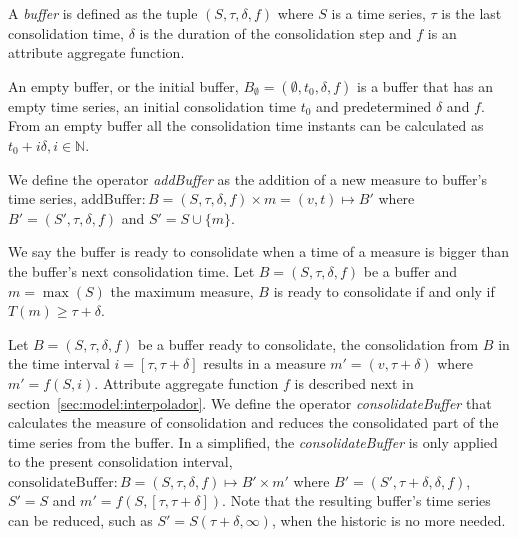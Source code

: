 \begin{definition}[Buffer]
  A \emph{buffer} is defined as the tuple $(S,\tau,\delta,f)$ where
  $S$ is a time series, $\tau$ is the last consolidation time, $\delta$
  is the duration of the consolidation step and $f$ is an
  attribute aggregate function.
\end{definition}

An empty buffer, or the initial buffer, $B_{\emptyset} =
(\emptyset,t_0, \delta, f)$ is a buffer that has an empty time series,
an initial consolidation time $t_0$ and predetermined $\delta$ and $f$. From
an empty buffer all the consolidation time instants can be calculated
as $t_0+i\delta, i\in\mathbb{N}$.

We define the operator \emph{addBuffer} as the addition of a new
measure to buffer's time series, $\text{addBuffer}: B =
(S,\tau,\delta,f) \times m = (v,t) \mapsto B'$ where
$B'=(S',\tau,\delta,f)$ and $S' = S \cup \{m\} $.



We say the buffer is ready to consolidate when a time of a measure is
bigger than the buffer's next consolidation time.  Let
$B=(S,\tau,\delta,f)$ be a buffer and $m=\max(S)$ the maximum measure,
$B$ is ready to consolidate if and only if $T(m) \geq \tau+\delta$.



Let $B=(S,\tau,\delta,f)$ be a buffer ready to consolidate, the
consolidation from $B$ in the time interval $i=[\tau,\tau+\delta]$
results in a measure $m'=(v,\tau+\delta)$ where $m'=f(S,i)$. Attribute
aggregate function $f$ is described next in
section~\ref{sec:model:interpolador}.  We define the operator
\emph{consolidateBuffer} that calculates the measure of consolidation
and reduces the consolidated part of the time series from the
buffer. In a simplified, the \emph{consolidateBuffer} is only applied
to the present consolidation interval, $\text{consolidateBuffer}:
B=(S,\tau,\delta,f) \mapsto B' \times m' $ where $ B'=
(S',\tau+\delta,\delta,f)$, $ S' = S$ and $m' =
f(S,[\tau,\tau+\delta])$. Note that the resulting buffer's time series
can be reduced, such as $ S' = S(\tau+\delta,\infty)$, when the
historic is no more needed.








